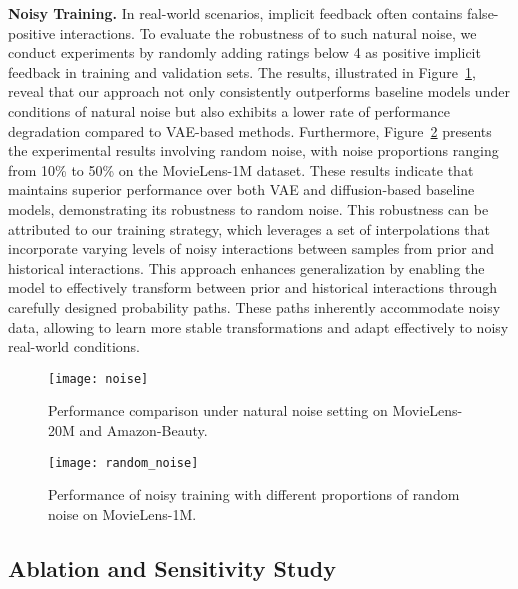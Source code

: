 \documentclass[sigconf]{acmart}
\begin{document}
\vspace{3pt}
\noindent \textbf{Noisy Training.} In real-world scenarios, implicit feedback often contains false-positive interactions.
To evaluate the robustness of \ours to such natural noise, we conduct experiments by randomly adding ratings below 4 as positive implicit feedback in training and validation sets. The results, illustrated in Figure~\ref{fig:noise}, reveal that our approach not only consistently outperforms baseline models under conditions of natural noise but also exhibits a lower rate of performance degradation compared to VAE-based methods. Furthermore, Figure~\ref{fig:random_noise} presents the experimental results involving random noise, with noise proportions ranging from 10\% to 50\% on the MovieLens-1M dataset. These results indicate that \ours maintains superior performance over both VAE and diffusion-based baseline models, demonstrating its robustness to random noise.
This robustness can be attributed to our training strategy, which leverages a set of interpolations that incorporate varying levels of noisy interactions between samples from prior and historical interactions. This approach enhances generalization by enabling the model to effectively transform between prior and historical interactions through carefully designed probability paths. These paths inherently accommodate noisy data, allowing \ours to learn more stable transformations and adapt effectively to noisy real-world conditions.

\vspace{-0.3cm}
\begin{figure}[ht]
    \setlength{\abovecaptionskip}{-0.0cm}
    \setlength{\belowcaptionskip}{-0.3cm}
    \centering
    \texttt{[image: noise]}
    \caption{Performance comparison under natural noise setting on MovieLens-20M and Amazon-Beauty.}
    \label{fig:noise}
\end{figure}


\begin{figure}[ht]
	\setlength{\abovecaptionskip}{0.1cm}
    \setlength{\belowcaptionskip}{0.2cm}
    \texttt{[image: random\_noise]}
    \caption{Performance of noisy training with different proportions of random noise on MovieLens-1M.}
    \label{fig:random_noise}
\end{figure}

\subsection{Ablation and Sensitivity Study}
\end{document}
